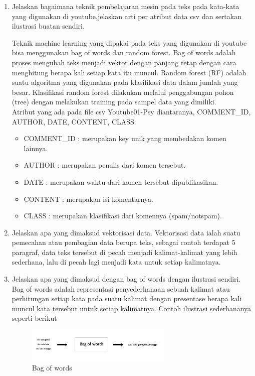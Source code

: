 \begin{enumerate}
	\item Jelaskan bagaimana teknik pembelajaran mesin pada teks pada kata-kata yang digunakan di youtube,jelaskan arti per atribut data csv dan sertakan ilustrasi buatan sendiri.

	Teknik machine learning yang dipakai pada teks yang digunakan di youtube bisa menggunakan bag of words dan random forest. Bag of words adalah proses mengubah teks menjadi vektor dengan panjang tetap dengan cara menghitung berapa kali setiap kata itu muncul. Random forest (RF) adalah suatu algoritma yang digunakan pada klasifikasi data dalam jumlah yang besar. Klasifikasi random forest dilakukan melalui penggabungan pohon (tree) dengan melakukan training pada sampel data yang dimiliki.\\
	Atribut yang ada pada file csv Youtube01-Psy diantaranya, COMMENT\_ID, AUTHOR, DATE, CONTENT, CLASS.
	\begin{itemize}
		\item COMMENT\_ID : merupakan key unik yang membedakan komen lainnya.
		\item AUTHOR : merupakan penulis dari komen tersebut.
		\item DATE : merupakan waktu dari komen tersebut dipublikasikan.
		\item CONTENT : merupakan isi komentarnya.
		\item CLASS : merupakan klasifikasi dari komennya (spam/notspam).
	\end{itemize}

	\item Jelaskan apa yang dimaksud vektorisasi data.
	\hfill\break
	Vektorisasi data ialah suatu pemecahan atau pembagian data berupa teks, sebagai contoh terdapat 5 paragraf, data teks tersebut di pecah menjadi kalimat-kalimat yang lebih sederhana, lalu di pecah lagi menjadi kata untuk setiap kalimatnya. 

	\item Jelaskan apa yang dimaksud dengan bag of words dengan ilustrasi sendiri.
	\hfill\break
	Bag of words adalah representasi penyederhanaan sebuah kalimat atau perhitungan setiap kata pada suatu kalimat dengan presentase berapa kali muncul kata tersebut untuk setiap kalimatnya. Contoh ilustrasi sederhananya seperti berikut 

	\begin{figure}[H]
	\centering
		\includegraphics[width=7cm]{figures/1174087/4/3.png}
		\caption{Bag of words}
	\end{figure}


\end{enumerate}
